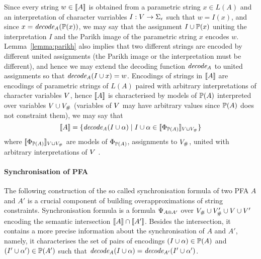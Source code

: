 \documentclass[sigplan,review,anonymous]{acmart}\settopmatter{printfolios=true,printccs=false,printacmref=false}
\begin{document}
Since every string $w \in [\![A]\!]$ is obtained from a parametric string $x\in L(A)$ and an interpretation of character varriables $I:V\rightarrow\Sigma_\epsilon$ such that $w = I(x)$, and since $x = \mathit{decode_{A}}(\mathbb{P}{(x)})$, 
we may say that the assignment $I \cup \mathbb{P}{(x)}$ uniting the interpretation $I$ and the Parikh image of the parametric string $x$ encodes $w$. Lemma~\ref{lemma:parikh} also implies that two different strings are encoded by different united assignments (the Parikh image or the interpretation must be different), and hence we may extend the decoding function $\mathit{decode_{A}}$ to united assignments so that $\mathit{decode_{A}}(I \cup x) = w$.
Encodings of strings in $[\![A]\!]$ are encodings of parametric strings of $L(A)$ paired with arbitrary interpretations of character variables $V$, 
hence $[\![A]\!]$ is characterised by models of $\mathbb{P}{(A)}$ interpreted over variables $V\cup V_\#$ (variables of $V$  may have arbitrary values since $\mathbb{P}{(A)}$ does not constraint them), we may say that 
 $$[\![A]\!] = \{\mathit{decode_{A}}(I\cup \alpha) \mid I\cup\alpha\in[\![\Phi_{\mathbb{P}{(A)}}]\!]_{V\cup V_\#}\}$$
where $[\![\Phi_{\mathbb{P}{(A)}}]\!]_{V\cup V_\#}$ are models of $\Phi_{\mathbb{P}{(A)}}$, assignments to $V_\#$, united with arbitrary interpretations of $V$ .

\paragraph{Synchronisation of PFA}
The following construction of the so called synchronisation formula of two PFA $A$ and $A'$ is a crucial component of building overapproximations of string constraints. 
Synchronisation formula is a formula $\Psi_{A \Cap A'}$ over $V_\#\cup V'_\#\cup V\cup V'$ encoding the semantic intersection $[\![A]\!] \cap [\![A']\!]$. Besides the intersection, it contains a more precise information about the synchronisation of $A$ and ${A'}$, 
namely, it characterises the set of pairs of encodings $(I\cup \alpha)\in \mathbb{P}{(A)}$ and $(I'\cup \alpha')\in\mathbb{P}{(A')}$ such that 
$\mathit{decode_{A}}(I\cup \alpha) = \mathit{decode_{A'}}(I'\cup \alpha')$.%
\end{document}
